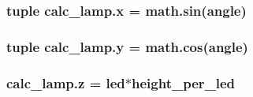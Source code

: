 \subsubsection[{x}]{\setlength{\rightskip}{0pt plus 5cm}tuple calc\+\_\+lamp.\+x = math.\+sin({\bf angle})}\label{namespacecalc__lamp_aa8ac454a435aa87a128701d48e86b265}
\hypertarget{namespacecalc__lamp_ace4756a004516f85bd3e10ec64c6f56e}{}
\subsubsection[{y}]{\setlength{\rightskip}{0pt plus 5cm}tuple calc\+\_\+lamp.\+y = math.\+cos({\bf angle})}\label{namespacecalc__lamp_ace4756a004516f85bd3e10ec64c6f56e}
\hypertarget{namespacecalc__lamp_a3b8d6def1fba2f531a1c3cb590dd0bc7}{}
\subsubsection[{z}]{\setlength{\rightskip}{0pt plus 5cm}calc\+\_\+lamp.\+z = led$\ast${\bf height\+\_\+per\+\_\+led}}\label{namespacecalc__lamp_a3b8d6def1fba2f531a1c3cb590dd0bc7}

